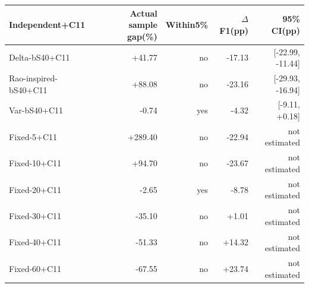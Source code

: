 \setlength{\tabcolsep}{3pt}\begin{tabular}{lrrrr}\toprule
Independent+C11 & Actual sample gap(\%) & Within5\% & $\Delta$F1(pp) & 95\% CI(pp) \\\midrule
Delta-bS40+C11 & +41.77 & no & -17.13 & [-22.99, -11.44] \\
Rao-inspired-bS40+C11 & +88.08 & no & -23.16 & [-29.93, -16.94] \\
Var-bS40+C11 & -0.74 & yes & -4.32 & [-9.11, +0.18] \\
Fixed-5+C11 & +289.40 & no & -22.94 & not estimated \\
Fixed-10+C11 & +94.70 & no & -23.67 & not estimated \\
Fixed-20+C11 & -2.65 & yes & -8.78 & not estimated \\
Fixed-30+C11 & -35.10 & no & +1.01 & not estimated \\
Fixed-40+C11 & -51.33 & no & +14.32 & not estimated \\
Fixed-60+C11 & -67.55 & no & +23.74 & not estimated \\
\bottomrule\end{tabular}
